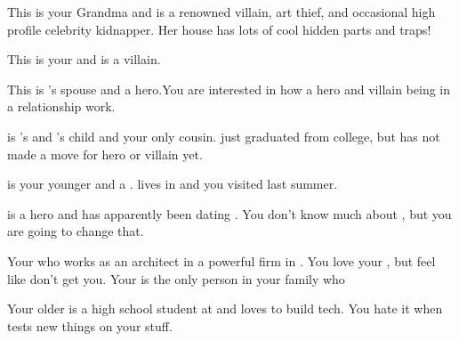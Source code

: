 \documentclass[char]{LRSguildcamp1}
\begin{document}
\begin{itemz}[Notes]
	\item 
\end{itemz}
\begin{contacts}
	\contact{\cGrandma{}} This is your Grandma and is a renowned villain, art thief, and occasional high profile celebrity kidnapper. Her house has lots of cool hidden parts and traps!
	
	\contact{\cOldest{}} This is your \cOldest{\uncle} and is a villain. 
	
	\contact{\cOS{}} This is \cOldest{}'s spouse and a hero.You are interested in how a hero and villain being in a relationship work. 
	
	\contact{\cGrad{}} \cGrad{} is \cOldest{}'s and \cOS{}'s child and your only cousin. \cGrad{\They} just graduated from college, but has not made a move for hero or villain yet. 
	
	\contact{\cYoungest{}} \cYoungest{} is your younger \cYoungest{\uncle} and a \cYoungest{\hero}. \cYoungest{} lives in \pCityYoungest{} and you visited \cYoungest{\them} last summer.  
	
	\contact{\cYS{}} \cYS{} is a hero and has apparently been dating \cYoungest{}. You don't know much about \cYS{\them}, but you are going to change that. 
	
	\contact{\cArchitect{}} Your \cArchitect{\parent} who works as an architect in a powerful firm in \pCityArchitect{}.  You love your \cArchitect{\parent}, but feel like \cArchitect{\they} don't get you. Your \cArchitect{\parent} is the only person in your family who 
	
	 	\contact{\cTeen{}} Your older \cTeen{\sibling} is a high school student at \pNormalSchool{} and loves to build tech. You hate it when \cTeen{} tests new things on your stuff. 
		
\end{contacts}
\end{document}
